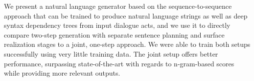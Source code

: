 We present a natural language generator based on the sequence-to-sequence approach that can be trained to produce natural language strings as well as deep syntax dependency trees from input dialogue acts, and we use it to directly compare two-step generation with separate sentence planning and surface realization stages to a joint, one-step approach. We were able to train both setups successfully using very little training data. The joint setup offers better performance, surpassing state-of-the-art with regards to n-gram-based scores while providing more relevant outputs.
